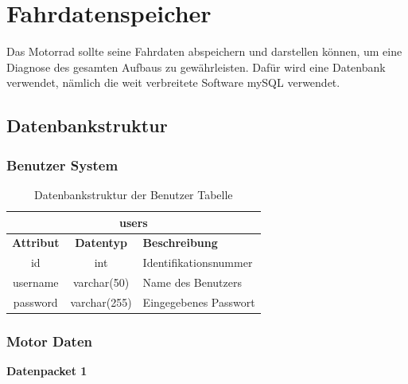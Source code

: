 \newpage


\section{Fahrdatenspeicher}

Das Motorrad sollte seine Fahrdaten abspeichern und darstellen können, um eine Diagnose des gesamten Aufbaus zu gewährleisten. Dafür wird eine Datenbank verwendet, nämlich die weit verbreitete Software mySQL verwendet.

\subsection{Datenbankstruktur}

\subsubsection{Benutzer System}

\begin{table}[H]
	\begin{center}
		\begin{tabular}{|c|c|l|}
		\hline
		\multicolumn{3}{|c|}{\textbf{users}}                          \\ \hline
		\textbf{Attribut} & \textbf{Datentyp} & \textbf{Beschreibung} \\ \hline
		id                & int               & Identifikationsnummer \\ \hline
		username          & varchar(50)       & Name des Benutzers    \\ \hline
		password          & varchar(255)      & Eingegebenes Passwort \\ \hline
		\end{tabular}
		\caption{Datenbankstruktur der Benutzer Tabelle}
		\label{tab:logindata}
	\end{center}
\end{table}

\subsubsection{Motor Daten}

\textbf{Datenpacket 1}
 
